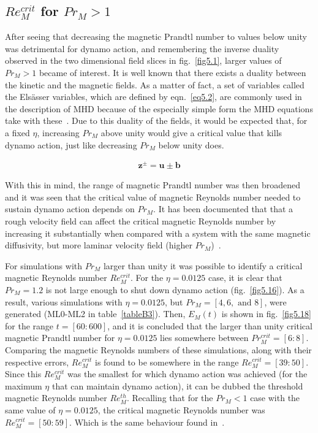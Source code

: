 \documentclass[12pt,a4paper]{report}
\begin{document}
\subsection{$Re_M^{crit}$ for $Pr_M > 1$}

After seeing that decreasing the magnetic Prandtl number to values below unity was detrimental for dynamo action, and remembering the inverse duality observed in the two dimensional field slices in fig.~\ref{fig5.1}, larger values of $Pr_M > 1$ became of interest. It is well known that there exists a duality between the kinetic and the magnetic fields. As a matter of fact, a set of variables called the Els\"asser variables, which are defined by eqn.~\ref{eq5.2}, are commonly used in the description of MHD because of the especially simple form the MHD equations take with these~\cite{tobias2011mhd, biskamp1997nonlinear}. Due to this duality of the fields, it would be expected that, for a fixed $\eta$, increasing $Pr_M$ above unity would give a critical value that kills dynamo action, just like decreasing $Pr_M$ below unity does. 

\begin{align}
 \bm z^{\pm} = \bm u \pm \bm b \label{eq5.2}
\end{align}


With this in mind, the range of magnetic Prandtl number was then broadened and it was seen that the critical value of magnetic Reynolds number needed to sustain dynamo action depends on $Pr_M$. It has been documented that that a rough velocity field can affect the critical magnetic Reynolds number by increasing it substantially when compared with a system with the same magnetic diffusivity, but more laminar velocity field (higher $Pr_M$)~\cite{schekochihin2004critical, schekochihin2005onset}.

For simulations with $Pr_M$ larger than unity it was possible to identify a critical magnetic Reynolds number $Re_M^{crit}$. For the $\eta=0.0125$ case, it is clear that $Pr_M=1.2$ is not large enough to shut down dynamo action (fig.~\ref{fig5.16}). As a result, various simulations with $\eta=0.0125$, but $Pr_M=[4, 6,\text{ and }8]$, were generated (ML0-ML2 in table~\ref{tableB3}). Then, $E_M(t)$ is shown in fig.~\ref{fig5.18} for the range $t=[60:600]$, and it is concluded that the larger than unity critical magnetic Prandtl number for $\eta=0.0125$ lies somewhere between $Pr_M^{crit}=[6:8]$. Comparing the magnetic Reynolds numbers of these simulations, along with their respective errors, $Re_M^{crit}$ is found to be somewhere in the range $Re_M^{crit}=[39:50]$. Since this $Re_M^{crit}$ was the smallest for which dynamo action was achieved (for the maximum $\eta$ that can maintain dynamo action), it can be dubbed the threshold magnetic Reynolds number $Re_M^{th}$. Recalling that for the $Pr_M < 1$ case with the same value of $\eta=0.0125$, the critical magnetic Reynolds number was $Re_M^{crit}=[50:59]$. Which is the same behaviour found in~\cite{schekochihin2004critical}. 
\end{document}
